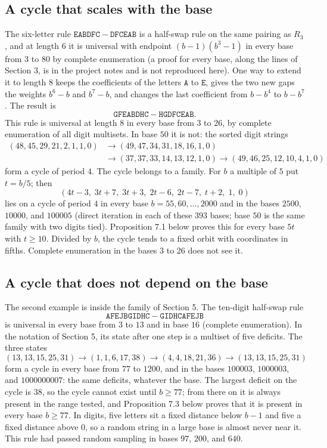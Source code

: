 \documentclass[11pt,letterpaper]{article}
\theoremstyle{paperstyle}
\theoremstyle{paperstyledef}
\theoremstyle{paperstylerem}
\begin{document}
\subsection{A cycle that scales with the base}\label{a-cycle-that-scales-with-the-base}

The six-letter rule \(\mathtt{EABDFC} - \mathtt{DFCEAB}\) is a half-swap rule on the same pairing as \(R_3\), and at length \(6\) it is universal with endpoint \((b-1)(b^3-1)\) in every base from \(3\) to \(80\) by complete enumeration (a proof for every base, along the lines of Section 3, is in the project notes and is not reproduced here). One way to extend it to length \(8\) keeps the coefficients of the letters \(\mathtt{A}\) to \(\mathtt{E}\), gives the two new gaps the weights \(b^6 - b\) and \(b^7 - b\), and changes the last coefficient from \(b - b^4\) to \(b - b^7\). The result is \[\mathtt{GFEABDHC} - \mathtt{HGDFCEAB}.\] This rule is universal at length \(8\) in every base from \(3\) to \(26\), by complete enumeration of all digit multisets. In base \(50\) it is not: the sorted digit strings \[\begin{aligned}(48,45,29,21,2,1,1,0) &\to (49,47,34,31,18,16,1,0) \\ &\to (37,37,33,14,13,12,1,0) \to (49,46,25,12,10,4,1,0)\end{aligned}\] form a cycle of period \(4\). The cycle belongs to a family. For \(b\) a multiple of \(5\) put \(t = b/5\); then \[(4t-3,\; 3t+7,\; 3t+3,\; 2t-6,\; 2t-7,\; t+2,\; 1,\; 0)\] lies on a cycle of period \(4\) in every base \(b = 55, 60, \dots, 2000\) and in the bases \(2500\), \(10000\), and \(100005\) (direct iteration in each of these \(393\) bases; base \(50\) is the same family with two digits tied). Proposition 7.1 below proves this for every base \(5t\) with \(t \geq 10\). Divided by \(b\), the cycle tends to a fixed orbit with coordinates in fifths. Complete enumeration in the bases \(3\) to \(26\) does not see it.

\subsection{A cycle that does not depend on the base}\label{a-cycle-that-does-not-depend-on-the-base}

The second example is inside the family of Section 5. The ten-digit half-swap rule \[\mathtt{AFEJBGIDHC} - \mathtt{GIDHCAFEJB}\] is universal in every base from \(3\) to \(13\) and in base \(16\) (complete enumeration). In the notation of Section 5, its state after one step is a multiset of five deficits. The three states \[(13,13,15,25,31) \to (1,1,6,17,38) \to (4,4,18,21,36) \to (13,13,15,25,31)\] form a cycle in every base from \(77\) to \(1200\), and in the bases \(100003\), \(1000003\), and \(1000000007\): the same deficits, whatever the base. The largest deficit on the cycle is \(38\), so the cycle cannot exist until \(b \geq 77\); from there on it is always present in the range tested, and Proposition 7.3 below proves that it is present in every base \(b \geq 77\). In digits, five letters sit a fixed distance below \(b-1\) and five a fixed distance above \(0\), so a random string in a large base is almost never near it. This rule had passed random sampling in bases \(97\), \(200\), and \(640\).
\end{document}
